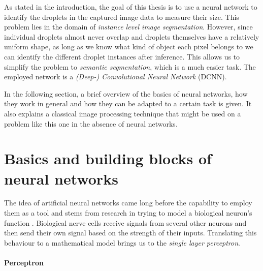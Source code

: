As stated in the introduction, the goal of this thesis is to use a neural network to identify the droplets in the captured image data to measure their size. 
This problem lies in the domain of \emph{instance level image segmentation}.
However, since individual droplets almost never overlap and droplets themselves have a relatively uniform shape, as long as we know what kind of object each pixel belongs to we can identify the different droplet instances after inference.
This allows us to simplify the problem to \emph{semantic segmentation}, which is a much easier task.
The employed network is a \emph{(Deep-) Convolutional Neural Network} (DCNN). 

In the following section, a brief overview of the basics of neural networks, how they work in general and how they can be adapted to a certain task is given. It also explains a classical image processing technique that might be used on a problem like this one in the absence of neural networks.

\section{Basics and building blocks of neural networks}
\label{sec:building_blocks}

The idea of artificial neural networks came long before the capability to employ them as a tool and stems from research in trying to model a biological neuron's function \cite{macukowNeuralNetworksState2016}. Biological nerve cells receive signals from several other neurons and then send their own signal based on the strength of their inputs. Translating this behaviour to a mathematical model brings us to the \emph{single layer perceptron}.

\paragraph*{Perceptron}

